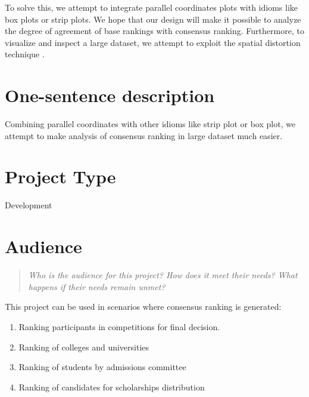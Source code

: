 \documentclass{proc}
\begin{document}

To solve this, we attempt to integrate parallel coordinates plots with idioms like box plots or strip plots. We hope that our design will make it possible to analyze the degree of agreement of base rankings with consensus ranking. Furthermore, to visualize and inspect a large dataset, we attempt to exploit the spatial distortion technique \cite{sarkar1993stretching}.



% 

\section{One-sentence description}
Combining parallel coordinates with other idioms like strip plot or box plot, we attempt to make analysis of consensus ranking in large dataset much easier.

\section{Project Type}
Development

\section{Audience} 
\begin{quote}
\textit{Who is the audience for this project? 
How does it meet their needs? 
What happens if their needs remain unmet?}
\end{quote}

This project can be used in scenarios where consensus ranking is generated:
\begin{enumerate}
  \item Ranking participants in competitions for final decision.
  \item Ranking of colleges and universities
  \item Ranking of students by admissions committee
  \item Ranking of candidates for scholarships distribution 
\end{enumerate}
\end{document}
